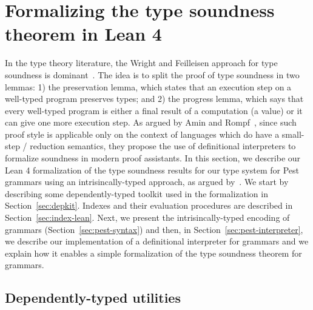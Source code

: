 \documentclass[preprint,12pt]{elsarticle}
\theoremstyle{definition}
\begin{document}
\section{Formalizing the type soundness theorem in Lean 4}\label{sec:typesoundnesslean}

In the type theory literature, the Wright and Feilleisen approach for type soundness is
dominant~\cite{Wright94}. The idea is to split the proof of type soundness in two lemmas:
1) the preservation lemma, which states that an execution step on a well-typed program
preserves types; and 2) the progress lemma, which says that every well-typed program is
either a final result of a computation (a value) or it can give one more execution step.
As argued by Amin and Rompf~\cite{Amin17}, since such proof style is applicable only on
the context of languages which do have a small-step / reduction semantics, they propose the use of
definitional interpreters to formalize soundness in modern proof assistants.
In this section, we describe our Lean 4 formalization of the type soundness results for our
type system for Pest grammars using an intrisincally-typed approach, as argued by~\cite{plfa22.08}.
We start by describing some dependently-typed toolkit
used in the formalization in Section~\ref{sec:depkit}. Indexes and their
evaluation procedures are described in Section~\ref{sec:index-lean}. Next, we present
the intrisincally-typed encoding of grammars (Section~\ref{sec:pest-syntax}) and then,
in Section~\ref{sec:pest-interpreter}, we describe our implementation of a definitional
interpreter for grammars and we explain how it enables a simple formalization of the type
soundness theorem for grammars.

\subsection{Dependently-typed utilities}~\label{sec:depkit}
\end{document}

